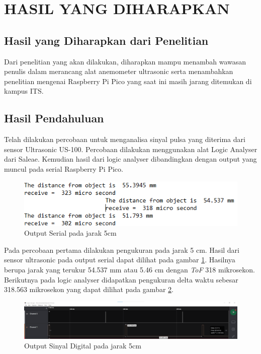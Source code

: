 \section{HASIL YANG DIHARAPKAN}

\subsection{Hasil yang Diharapkan dari Penelitian}

Dari penelitian yang akan dilakukan, diharapkan mampu menambah wawasan penulis dalam merancang alat anemometer ultrasonic serta
menambahkan penelitian mengenai Raspberry Pi Pico yang saat ini masih jarang ditemukan di kampus ITS.

\subsection{Hasil Pendahuluan}

Telah dilakukan percobaan untuk menganalisa
sinyal pulsa yang diterima dari sensor Ultrasonic US-100. Percobaan dilakukan menggunakan alat Logic Analyser dari Saleae. Kemudian hasil dari logic analyser dibandingkan dengan output yang muncul pada 
serial Raspberry Pi Pico.

\begin{figure}[h!]
	\centering
	\includegraphics[width=0.7\linewidth]{gambar/serial5cm}
	\caption{Output Serial pada jarak 5cm}
	\label{fig:serial5cm}
\end{figure}

Pada percobaan pertama dilakukan pengukuran pada jarak 5 cm. Hasil dari sensor ultrasonic pada output 
serial dapat dilihat pada gambar \ref{fig:serial5cm}. Hasilnya berupa jarak yang terukur 54.537 mm atau 5.46 cm dengan \textit{ToF} 318 mikrosekon. Berikutnya pada logic analyser didapatkan pengukuran 
delta waktu sebesar 318.563 mikrosekon yang dapat dilihat pada gambar \ref{fig:logic5cm}.

\begin{figure}[h!]
	\centering
	\includegraphics[width=\linewidth]{gambar/logic5cm}
	\caption{Output Sinyal Digital pada jarak 5cm}
	\label{fig:logic5cm}
\end{figure}

